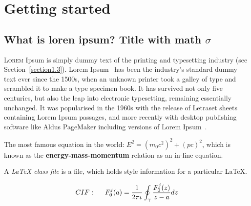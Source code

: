 
\chapter{Getting started}  %

\ifpdf
    \graphicspath{{Chapter1/Figs/Raster/}{Chapter1/Figs/PDF/}{Chapter1/Figs/}}
\else
    \graphicspath{{Chapter1/Figs/Vector/}{Chapter1/Figs/}}
\fi


\section{What is loren ipsum? Title with math \texorpdfstring{$\sigma$}{[sigma]}} %

\lettrine{L}{orem} Ipsum is simply dummy text of the printing and typesetting industry (see 
Section~\ref{section1.3}). Lorem Ipsum~\citep{Aup91} has been the industry's 
standard dummy text ever since the 1500s, when an unknown printer took a galley 
of type and scrambled it to make a type specimen book. It has survived not only 
five centuries, but also the leap into electronic typesetting, remaining 
essentially unchanged. It was popularised in the 1960s with the release of 
Letraset sheets containing Lorem Ipsum passages, and more recently with desktop 
publishing software like Aldus PageMaker including versions of Lorem 
Ipsum~\citep{AAB95,Con90,LM65}.

The most famous equation in the world: $E^2 = (m_0c^2)^2 + (pc)^2$, which is 
known as the \textbf{energy-mass-momentum} relation as an in-line equation.

A {\em \LaTeX{} class file} is a file, which holds style information for a particular \LaTeX{}.


\begin{align}
CIF: \hspace*{5mm}F_0^j(a) = \frac{1}{2\pi \iota} \oint_{\gamma} \frac{F_0^j(z)}{z - a} dz
\end{align}

